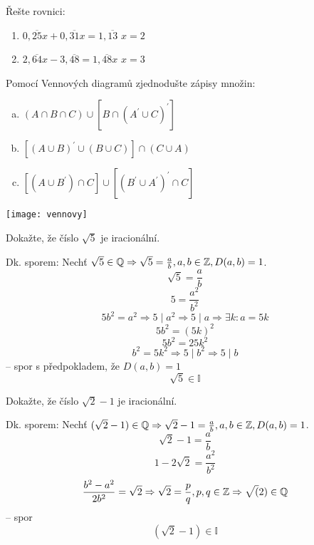 \begin{example}[SÚM 107/23*]
  Řešte rovnici:
  \begin{enumerate}
    \item $0,\overline{25}x + 0,\overline{31}x = 1,\overline{13}$ \hfill $x=2$
    \item $2,\overline{64}x - 3,\overline{48} = 1,\overline{48}x$  \hfill $x = 3$
  \end{enumerate}
\end{example}

\begin{example}
  Pomocí Vennových diagramů zjednodušte zápisy množin: \\
  \begin{minipage}{0.5\textwidth}
    \begin{enumerate}[a.]
      \item $(A \cap B \cap C) \cup [B \cap (A^\prime \cup C)^\prime]$
      \item $[(A \cup B)^\prime \cup (B \cup C)] \cap (C \cup A)$
      \item $[(A \cup B^\prime) \cap C] \cup [(B^\prime \cup A^\prime)^\prime \cap C]$
    \end{enumerate}
  \end{minipage}
  \hfill
  \noindent\begin{minipage}{0.5\textwidth}
      \texttt{[image: vennovy]}
  \end{minipage}
\end{example}

\begin{example}[SÚM 109/36]
  Dokažte, že číslo $\sqrt{5}$ je iracionální.

  Dk. sporem: Nechť $\sqrt{5} \in \mathbb{Q} \Rightarrow \sqrt{5} = \frac{a}{b}, a, b \in \mathbb{Z}, D(a, b) = 1$.
  $$\sqrt{5} = \frac{a}{b}$$
  $$5 = \frac{a^2}{b^2}$$
  $$5b^2 = a^2 \Rightarrow 5 \mid a^2 \Rightarrow 5 \mid a \Rightarrow \exists k: a = 5k$$
  $$5b^2 = (5k)^2$$
  $$5b^2 = 25k^2$$
  $$b^2 = 5k^2 \Rightarrow 5 \mid b^2 \Rightarrow 5 \mid b$$ -- spor s předpokladem, že $D(a, b) = 1$
  $$\sqrt{5} \in \mathbb{I}$$
\end{example}

\begin{example}[SÚM 109/37]
  Dokažte, že číslo $\sqrt{2} - 1$ je iracionální.

  Dk. sporem: Nechť $(\sqrt{2} - 1) \in \mathbb{Q} \Rightarrow \sqrt{2} - 1 = \frac{a}{b}, a, b \in \mathbb{Z}, D(a, b) = 1$.
  $$\sqrt{2} - 1 = \frac{a}{b}$$
  $$1 - 2\sqrt{2} = \frac{a^2}{b^2}$$
  $$\frac{b^2-a^2}{2b^2} = \sqrt{2} \Rightarrow \sqrt{2} = \frac{p}{q}, p,q \in \mathbb{Z} \Rightarrow \sqrt(2) \in \mathbb{Q}$$ -- spor
  $$(\sqrt{2} - 1) \in \mathbb{I}$$
\end{example}

